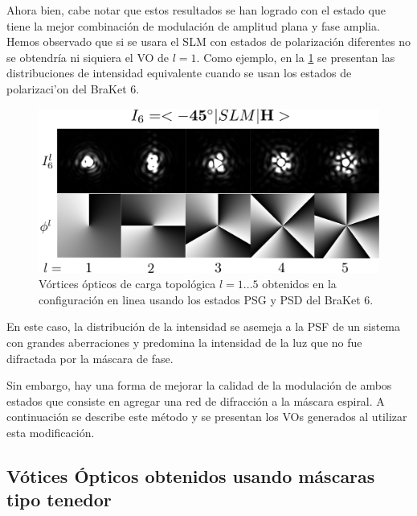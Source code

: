 Ahora bien, cabe notar que estos resultados se han logrado con el
estado que tiene la mejor combinación de modulación de amplitud plana
y fase amplia. Hemos observado que si se usara el SLM con estados de
polarización diferentes no se obtendría ni siquiera el VO de
$l=1$. Como ejemplo, en la \ref{fig:VOs_I6} se presentan las
distribuciones de intensidad equivalente cuando se usan los estados de
polarizaci'on del BraKet 6. 
\begin{figure}[h!]
\centering
\includegraphics[scale=0.4]{OV_I6.pdf}
\caption[Vórtices ópticos obtenidos en la configuración en linea para
el BraKet 6]{Vórtices ópticos de carga topológica $l=1...5$ obtenidos
  en la configuración en linea usando los estados PSG y PSD del BraKet 6.} 
\label{fig:VOs_I6}
\end{figure}
En este caso, la distribución de la intensidad se asemeja a la PSF de
un sistema con grandes aberraciones y predomina la intensidad de la
luz que no fue difractada por la máscara de fase. 

Sin embargo, hay una forma de mejorar la calidad de la modulación de
ambos estados que
consiste en agregar una red de difracción a la máscara espiral. A
continuación se describe este método y se presentan los VOs generados
al utilizar esta modificación. 

\subsection{Vótices Ópticos obtenidos usando máscaras tipo tenedor}


